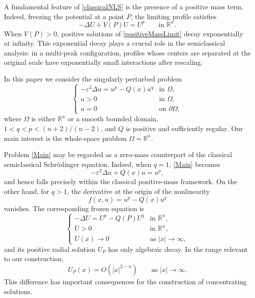 \documentclass[12pt]{amsart}
\theoremstyle{plain}
\theoremstyle{definition}
\theoremstyle{remark}
\renewcommand{\epsilon}{\varepsilon}
\begin{document}
A fundamental feature of \eqref{classicalNLS} is the presence of a positive
mass term. Indeed, freezing the potential at a point \(P\), the limiting
profile satisfies
\begin{equation}\label{positiveMassLimit}
 -\Delta U+V(P)U=U^p
 \qquad\text{in }\mathbb{R}^n.
\end{equation}
When \(V(P)>0\), positive solutions of \eqref{positiveMassLimit} decay
exponentially at infinity. This exponential decay plays a crucial role in
the semiclassical analysis: in a multi-peak configuration, profiles whose
centers are separated at the original scale have exponentially small
interactions after rescaling.

In this paper we consider the singularly perturbed problem
\begin{equation}\label{Main}
 \tag{$3$}
 \begin{cases}
 -\epsilon^2\Delta u=u^p-Q(x)u^q & \text{in }\Omega,\\
 u>0 & \text{in }\Omega,\\
 u=0 & \text{on }\partial\Omega,
 \end{cases}
\end{equation}
where \(\Omega\) is either \(\mathbb{R}^n\) or a smooth bounded domain,
\(1<q<p<(n+2)/(n-2)\), and \(Q\) is positive and sufficiently regular.
Our main interest is the whole-space problem \(\Omega=\mathbb{R}^n\).

Problem \eqref{Main} may be regarded as a zero-mass counterpart of the
classical semiclassical Schr\"odinger equation. Indeed, when \(q=1\),
\eqref{Main} becomes
\[
 -\epsilon^2\Delta u+Q(x)u=u^p,
\]
and hence falls precisely within the classical positive-mass framework.
On the other hand, for \(q>1\), the derivative at the origin of the
nonlinearity
\[
 f(x,u)=u^p-Q(x)u^q
\]
vanishes. The corresponding frozen equation is
\begin{equation}\label{BVPinf}\tag{$4$}
 \begin{cases}
 -\Delta U=U^p-Q(P)U^q & \text{in }\mathbb{R}^n,\\
 U>0 & \text{in }\mathbb{R}^n,\\
 U(x)\to0 & \text{as }|x|\to\infty,
 \end{cases}
\end{equation}
and its positive radial solution \(U_P\) has only algebraic decay. In the
range relevant to our construction,
\[
 U_P(x)=O(|x|^{2-n})
 \qquad\text{as }|x|\to\infty.
\]
This difference has important consequences for the construction of
concentrating solutions.
\end{document}
